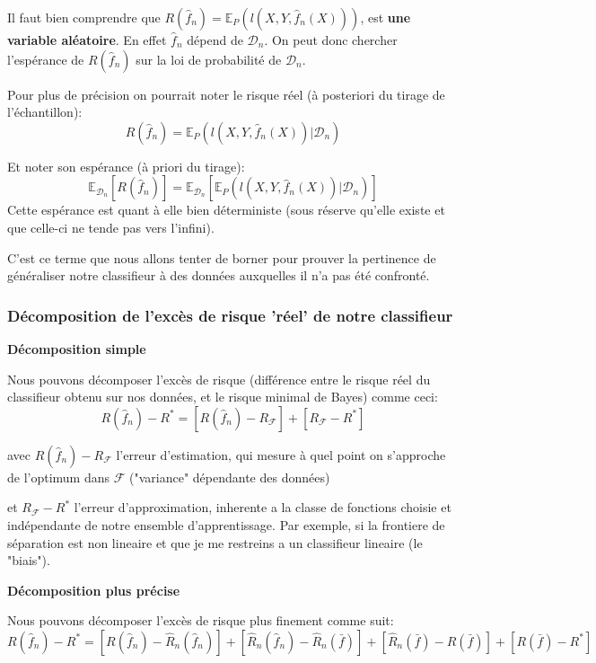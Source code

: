 \documentclass[a4paper]{article}
\theoremstyle{plain}
\begin{document}
Il faut bien comprendre que $R(\hat f_n) = \mathbb{E}_P(l(X,Y,\hat f_n(X)))$, est \textbf{une variable aléatoire}. En effet $\hat f_n$ dépend de $\mathcal{D}_n$. On peut donc chercher l'espérance de $R(\hat f_n)$ sur la loi de probabilité de $\mathcal{D}_n$. 

Pour plus de précision on pourrait noter le risque réel (à posteriori du tirage de l'échantillon):
$$R(\hat f_n) = \mathbb{E}_P(l(X,Y,\hat f_n(X))|\mathcal{D}_n)$$


Et noter son espérance (à priori du tirage): $$\mathbb{E}_{\mathcal{D}_n}[R(\hat f_n)] =\mathbb{E}_{\mathcal{D}_n}[ \mathbb{E}_P(l(X,Y,\hat f_n(X))|\mathcal{D}_n)]$$
Cette espérance est quant à elle bien déterministe (sous réserve qu'elle existe et que celle-ci ne tende pas vers l'infini).

C'est ce terme que nous allons tenter de borner pour prouver la pertinence de généraliser notre classifieur à des données auxquelles il n'a pas été confronté.

\subsubsection{Décomposition de l'excès de risque 'réel' de notre classifieur}

\textbf{Décomposition simple}

Nous pouvons décomposer l'excès de risque (différence entre le risque réel du classifieur obtenu sur nos données, et le risque minimal de Bayes) comme ceci: 
$$R(\hat f_n) - R^{\ast} = [R(\hat f_n) - R_{\mathcal{F}}] + [R_{\mathcal{F}} - R^{\ast}]$$

\label{Detail_exces_risque}

\begin{outline}

\1 avec $ R(\hat f_n) - R_{\mathcal{F}} $ l'erreur d'estimation, qui mesure à quel point on s'approche de l'optimum dans $\mathcal{F}$ ("variance" dépendante des données)

\1 et $ R_{\mathcal{F}} - R^{\ast}$ l'erreur d'approximation, inherente a la classe de fonctions choisie et indépendante de notre ensemble d'apprentissage. Par exemple, si la frontiere de séparation est
non lineaire et que je me restreins a un classifieur lineaire (le "biais"). 

\end{outline}

\textbf{Décomposition plus précise}

Nous pouvons décomposer l'excès de risque plus finement comme suit:
$$R(\hat f_n) - R^{\ast} = [R(\hat f_n) - \hat R_n(\hat f_n)] + [\hat R_n(\hat f_n) - \hat R_n(\bar f)] + [\hat R_n(\bar f) -R(\bar f)] + [R(\bar f) - R^{\ast}]$$
\end{document}
